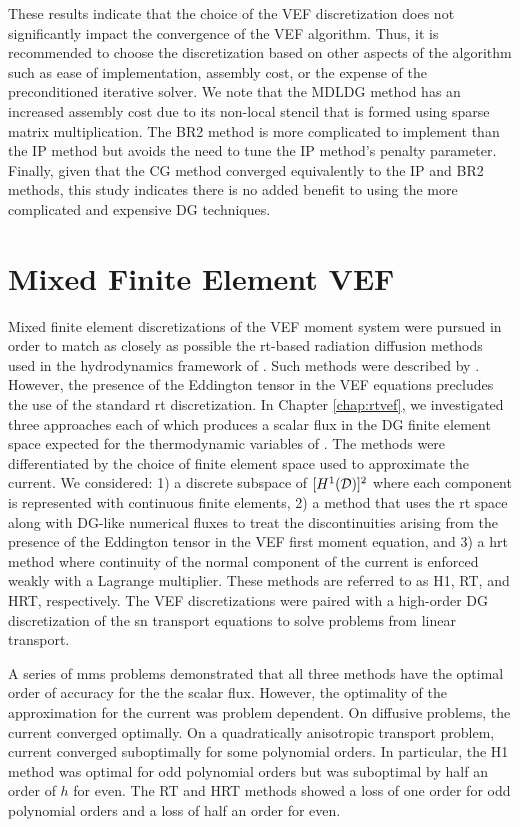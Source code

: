\documentclass[../doc.tex]{subfiles}
\begin{document}
These results indicate that the choice of the VEF discretization does not significantly impact the convergence of the VEF algorithm. Thus, it is recommended to choose the discretization based on other aspects of the algorithm such as ease of implementation, assembly cost, or the expense of the preconditioned iterative solver. We note that the MDLDG method has an increased assembly cost due to its non-local stencil that is formed using sparse matrix multiplication. The BR2 method is more complicated to implement than the IP method but avoids the need to tune the IP method's penalty parameter. Finally, given that the CG method converged equivalently to the IP and BR2 methods, this study indicates there is no added benefit to using the more complicated and expensive DG techniques. 

\section{Mixed Finite Element VEF}
Mixed finite element discretizations of the VEF moment system were pursued in order to match as closely as possible the \gls{rt}-based radiation diffusion methods used in the hydrodynamics framework of \cite{blast}. Such methods were described by \textcite{pete}. However, the presence of the Eddington tensor in the VEF equations precludes the use of the standard \gls{rt} discretization. In Chapter \ref{chap:rtvef}, we investigated three approaches each of which produces a scalar flux in the DG finite element space expected for the thermodynamic variables of \cite{blast}. 
The methods were differentiated by the choice of finite element space used to approximate the current. We considered: 1) a discrete subspace of $[H^1(\mathcal{D})]^2$ where each component is represented with continuous finite elements, 2) a method that uses the \gls{rt} space along with DG-like numerical fluxes to treat the discontinuities arising from the presence of the Eddington tensor in the VEF first moment equation, and 3) a \gls{hrt} method where continuity of the normal component of the current is enforced weakly with a Lagrange multiplier. These methods are referred to as H1, RT, and HRT, respectively. The VEF discretizations were paired with a high-order DG discretization of the \gls{sn} transport equations to solve problems from linear transport. 

A series of \gls{mms} problems demonstrated that all three methods have the optimal order of accuracy for the the scalar flux. However, the optimality of the approximation for the current was problem dependent. On diffusive problems, the current converged optimally. On a quadratically anisotropic transport problem, current converged suboptimally for some polynomial orders. In particular, the H1 method was optimal for odd polynomial orders but was suboptimal by half an order of $h$ for even. The RT and HRT methods showed a loss of one order for odd polynomial orders and a loss of half an order for even. 
\end{document}
